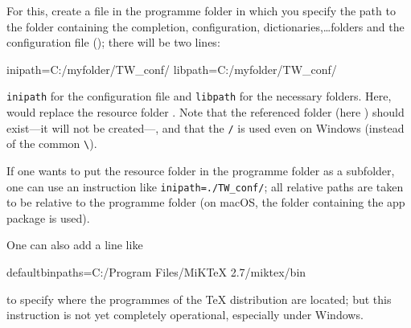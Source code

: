 For this, create a file  in the programme folder in which you specify the path to the folder containing the completion, configuration, dictionaries,\dots folders and the configuration file (); there will be two lines:
\begin{verbExample}
inipath=C:/myfolder/TW_conf/
libpath=C:/myfolder/TW_conf/
\end{verbExample}

\verb+inipath+ for the configuration file and \verb+libpath+ for the necessary folders. Here,  would replace the resource folder . Note that the referenced folder (here ) should exist---it will not be created---, and that the \verb|/| is used even on Windows (instead of the common \verb+\+).

If one wants to put the resource folder in the programme folder as a subfolder, one can use an instruction like \verb+inipath=./TW_conf/+; all relative paths are taken to be relative to the {\Tw} programme folder (on macOS, the folder containing the app package is used).

One can also add a line like
\begin{verbExample}
defaultbinpaths=C:/Program Files/MiKTeX 2.7/miktex/bin
\end{verbExample}
to specify where the programmes of the {\TeX} distribution are located; but this instruction is not yet completely operational, especially under Windows.
